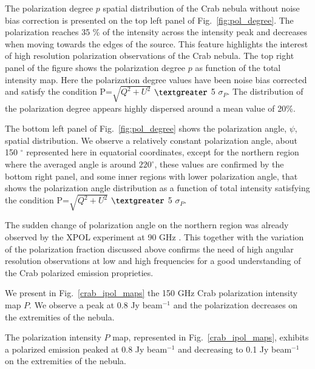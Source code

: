 \documentclass[twocolumn,traditabstract]{aa}
\begin{document}
The polarization degree $p$ spatial distribution of the Crab nebula without noise bias correction is presented on the top left panel of Fig.~\ref{fig:pol_degree}. The polarization reaches 35 \% of the intensity across the intensity peak and decreases when moving towards the edges of the source. 
This feature highlights the interest of high resolution polarization observations of the Crab nebula. The top right panel of the figure shows the polarization degree $p$ as function of the total intensity map. Here the polarization degree values have been noise bias corrected and satisfy the condition P=$\sqrt{Q^2+U^2}$ $\textgreater$ 5 $\sigma_P$. The distribution of the polarization degree appears highly dispersed around a mean value of 20\%.

The bottom left panel of Fig.~\ref{fig:pol_degree} shows  the polarization angle, $\psi$, spatial distribution.
We observe a relatively constant polarization angle, about 150 $^{\circ}$ represented here in equatorial coordinates, except for the northern region where the averaged angle is around $220^{\circ}$, 
these values are confirmed by the bottom right panel, and some inner regions with lower polarization angle, that shows the polarization angle distribution as a function of total intensity satisfying the condition P=$\sqrt{Q^2+U^2}$  $\textgreater$ 5 $\sigma_P$.

The sudden change of polarization angle on the northern region was already observed by the XPOL experiment at 90 GHz \citep{aumont2010}.
This together with the variation of the polarization fraction discussed above confirms the need of high angular resolution observations at low and high frequencies for a good understanding of the Crab polarized emission proprieties.

We present in Fig.~\ref{crab_ipol_maps} the 150 GHz Crab polarization intensity map $P$. We observe a peak at 0.8 Jy beam$^{-1}$ and the polarization decreases on the extremities of the nebula.

The polarization intensity $P$ map, represented in Fig.~\ref{crab_ipol_maps}, exhibits a polarized emission peaked at 0.8 Jy beam$^{-1}$ and decreasing to 0.1 Jy beam$^{-1}$ on the extremities of the nebula. 
\end{document}
